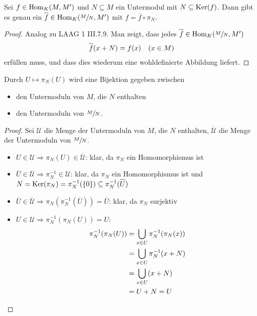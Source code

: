 \begin{proposition}
	Sei $f\in\operatorname{Hom}_K(M,M')$ und $N\subseteq M$ ein Untermodul mit $N\subseteq \operatorname{Ker}(f)$. Dann gibt es genau ein $\overline{f}\in\Hom_K(\qraum{M}{N},M')$ mit $f=\overline{f}\circ \pi_N$.
	\begin{center}
	\end{center}
\end{proposition}
\begin{proof}
	Analog zu LAAG 1 III.7.9. Man zeigt, dass jedes $\overline{f}\in\Hom_K(\qraum{M}{N},M')$
	\begin{align}
		\overline{f}(x+N)=f(x)\quad (x\in M)\notag
	\end{align}
	erfüllen muss, und dass dies wiederum eine wohldefinierte Abbildung liefert. %
\end{proof}

\begin{lemma}
	Durch $U\mapsto \pi_N(U)$ wird eine Bijektion gegeben zwischen
	\begin{itemize}
		\item den Untermoduln von $M$, die $N$ enthalten
		\item den Untermoduln von $\sfrac{M}{N}$.
	\end{itemize}
\end{lemma}
\begin{proof}
	Sei $\mathcal{U}$ die Menge der Untermoduln von $M$, die $N$ enthalten, $\overline{\mathcal{U}}$ die Menge der Untermoduln von $\sfrac{M}{N}$.
	\begin{itemize}
		\item $U\in\mathcal{U}\Rightarrow \pi_N(U)\in\overline{\mathcal{U}}$: klar, da $\pi_N$ ein Homomorphismus ist
		\item $\overline{U}\in\overline{\mathcal{U}}\Rightarrow \pi_N^{-1}\in\mathcal{U}$: klar, da $\pi_N$ ein Homomorphismus ist und $N=\Ker(\pi_N)=\pi_N^{-1}(\{0\})\subseteq \pi_N^{-1}(\overline{U})$
		\item $\overline{U}\in\overline{\mathcal{U}}\Rightarrow\pi_N(\pi_N^{-1}(\overline{U}))=\overline{U}$: klar, da $\pi_N$ surjektiv
		\item $U\in\mathcal{U}\Rightarrow \pi_N^{-1}(\pi_N(U))=U$:
		\begin{align}
			\pi_N^{-1}(\pi_N(U)) &= \bigcup_{x\in U} \pi_N^{-1}(\pi_N(x)) \notag \\
			&= \bigcup_{x\in U} \pi_N^{-1}(x+N) \notag \\
			&= \bigcup_{x\in U}(x+N) \notag \\
			&= U+N=U\notag
		\end{align}
	\end{itemize}
\end{proof}

